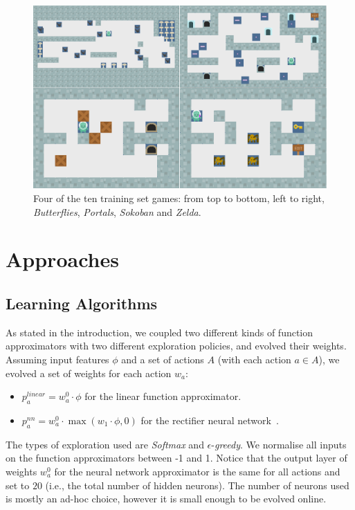 \documentclass[conference]{IEEEtran}
\begin{document}
\begin{figure}[!t]
\begin{center}
\includegraphics[width=1.8\columnwidth]{img/games}
\end{center}
\caption{Four of the ten training set games: from top to bottom, left to right, \textit{Butterflies}, \textit{Portals}, \textit{Sokoban} and \textit{Zelda}.}
\label{fig:games}
\end{figure}



\section{Approaches} \label{sec:approaches}

\subsection{Learning Algorithms}
As stated in the introduction, we coupled two different kinds of function approximators with two different exploration policies, and evolved their weights. Assuming input features $\phi$ and a set of actions $A$ (with each action $a \in A$), we evolved a set of weights for each action $w_a$:
\begin{itemize}
\item $p^{linear}_a = w_a^0 \cdot \phi$ for the linear function approximator.
\item $p^{nn}_a = w_a^0 \cdot \max { (w_1 \cdot \phi, 0) } $ for the rectifier neural network~\cite{glorot2011deep}.
\end{itemize}
The types of exploration used are \textit{Softmax} and $\epsilon$-\textit{greedy}. We normalise all inputs on the function approximators between -1 and 1. Notice that the output layer of weights $w_a^0$ for the neural network approximator is the same for all actions and set to $20$ (i.e., the total number of hidden neurons). The number of neurons used is mostly an ad-hoc choice, however it is small enough to be evolved online. 
\end{document}
